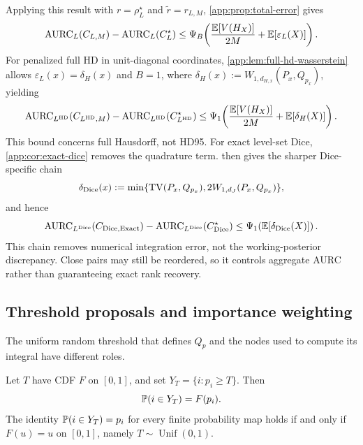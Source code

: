 Applying this result with $r=\rho_L^\star$ and
$\widetilde r=r_{L,M}$, \cref{app:prop:total-error} gives
\begin{equation*}
  \operatorname{AURC}_L(C_{L,M})-\operatorname{AURC}_L(C_L^\star)
  \leq
  \Psi_B\!\left(
    \frac{\mathbb E[V(H_X)]}{2M}
    +\mathbb E[\varepsilon_L(X)]
  \right).
\end{equation*}
For penalized full HD in unit-diagonal coordinates,
\cref{app:lem:full-hd-wasserstein}
allows $\varepsilon_L(x)=\delta_H(x)$ and $B=1$, where
$\delta_H(x):=W_{1,d_{H,x}}(P_x,Q_{p_x})$, yielding
\begin{equation*}
  \operatorname{AURC}_{L^{\mathrm{HD}}}(C_{L^{\mathrm{HD}},M})
  -\operatorname{AURC}_{L^{\mathrm{HD}}}(C_{L^{\mathrm{HD}}}^\star)
  \leq\Psi_1\!\left(
    \frac{\mathbb E[V(H_X)]}{2M}
    +\mathbb E[\delta_H(X)]
  \right).
\end{equation*}
This bound concerns full Hausdorff, not HD95.
For exact level-set Dice, \cref{app:cor:exact-dice} removes the
quadrature term.  then gives the sharper
Dice-specific chain
\begin{equation*}
  \delta_{\operatorname{Dice}}(x):=
  \min\{\operatorname{TV}(P_x,Q_{p_x}),
         2W_{1,d_J}(P_x,Q_{p_x})\},
\end{equation*}
and hence
\begin{equation*}
  \operatorname{AURC}_{L^{\operatorname{Dice}}}(C_{\operatorname{Dice},\mathrm{Exact}})
  -\operatorname{AURC}_{L^{\operatorname{Dice}}}(C_{\operatorname{Dice}}^\star)
  \leq\Psi_1\!\left(\mathbb E[\delta_{\operatorname{Dice}}(X)]\right).
\end{equation*}
This chain removes numerical integration error, not the working-posterior
discrepancy. Close pairs may still be reordered, so it controls aggregate AURC
rather than guaranteeing exact rank recovery.

\subsection{Threshold proposals and importance weighting}
\label{app:importance-thresholds}

The uniform random threshold that defines \(Q_p\) and the nodes used to
compute its integral have different roles.

\begin{proposition}
\label{app:prop:uniform-unique}
Let \(T\) have CDF \(F\) on \([0,1]\), and set
\(Y_T=\{i:p_i\geq T\}\). Then
\begin{equation*}
  \mathbb{P}(i\in Y_T)=F(p_i).
\end{equation*}
The identity \(\mathbb{P}(i\in Y_T)=p_i\) for every finite probability map holds if
and only if \(F(u)=u\) on \([0,1]\), namely \(T\sim\operatorname{Unif}(0,1)\).
\end{proposition}

